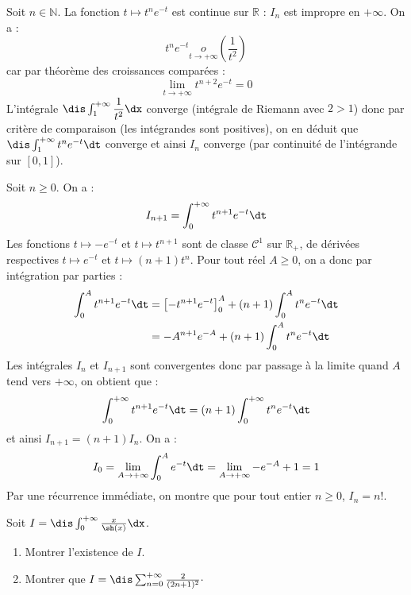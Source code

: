\documentclass[a4paper,10pt]{report}
\begin{document}
\corr Soit $n \in \mathbb{N}$. La fonction $t \mapsto  t^ne^{-t}$ est continue sur $\mathbb{R}$ : $I_n$ est impropre en $+ \infty$. On a :
$$ t^n e^{-t} \underset{t \rightarrow +\infty} o \left( \dfrac{1}{t^2} \right)$$
car par théorème des croissances comparées :
$$ \lim_{t \rightarrow + \infty} t^{n+2} e^{-t}=0$$
L'intégrale $\dis \int_1^{+ \infty} \dfrac{1}{t^2} \dx$ converge (intégrale de Riemann avec $2>1$) donc par critère de comparaison (les intégrandes sont positives), on en déduit que $\dis \int_1^{+ \infty} t^n e^{-t} \dt$ converge et ainsi $I_n$ converge (par continuité de l'intégrande sur $[0,1]$).

\medskip

\noindent Soit $n \geq 0$. On a :
$$ I_{n+1} = \int_0^{+ \infty} t^{n+1} e^{-t} \dt$$
Les fonctions $t \mapsto -e^{-t}$ et $t \mapsto t^{n+1}$ sont de classe $\mathcal{C}^1$ sur $\mathbb{R}_+$, de dérivées respectives $t \mapsto e^{-t}$ et $t \mapsto (n+1)t^n$. Pour tout réel $A \geq 0$, on a donc par intégration par parties :
\begin{align*}
\int_0^A t^{n+1} e^{-t} \dt & = \left[- t^{n+1} e^{-t} \right]_0^A +  (n+1) \int_0^A t^{n} e^{-t} \dt \\
& = -A^{n+1} e^{-A} +  (n+1) \int_0^A t^{n} e^{-t} \dt
\end{align*}
Les intégrales $I_n$ et $I_{n+1}$ sont convergentes donc par passage à la limite quand $A$ tend vers $+ \infty$, on obtient que :
$$ \int_0^{+ \infty} t^{n+1} e^{-t} \dt = (n+1)\int_0^{+ \infty} t^{n} e^{-t} \dt$$
et ainsi $I_{n+1}=(n+1) I_n$. On a :
$$ I_0 = \lim_{A \rightarrow + \infty} \int_0^A e^{-t} \dt = \lim_{A \rightarrow + \infty} -e^{-A}+1 = 1$$
Par une récurrence immédiate, on montre que pour tout entier $n \geq 0$, $I_n=n!$.

\begin{Exercice}{}\label{gamma} Soit $I = \dis \int_{0}^{+ \infty} \frac{x}{\sh(x)} \dx$.

\begin{enumerate}
\item Montrer l'existence de $I$.
\item Montrer que $I= \dis \sum_{n=0}^{+ \infty} \frac{2}{(2n+1)^2}\cdot$
\end{enumerate}
\end{Exercice} 

\corr 
\end{document}

